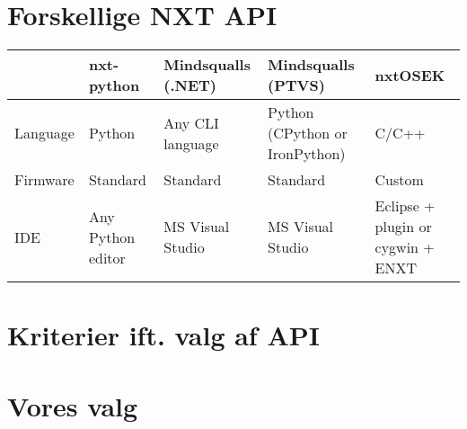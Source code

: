 \section{Forskellige NXT API}

\begin{table}
\begin{tabularx}{\textwidth}{|l|X|X|X|X|}
\hline
& nxt-python & Mindsqualls (.NET) & Mindsqualls (PTVS) & nxtOSEK \\ \hline
Language & Python & Any CLI language & Python (CPython or IronPython) & C/C++ \\ \hline
Firmware & Standard & Standard & Standard & Custom \\ \hline
IDE & Any Python editor & MS Visual Studio & MS Visual Studio & Eclipse + plugin or cygwin + ENXT \\ \hline
\end{tabularx}
\end{table}

\section{Kriterier ift. valg af API}

\section{Vores valg}
